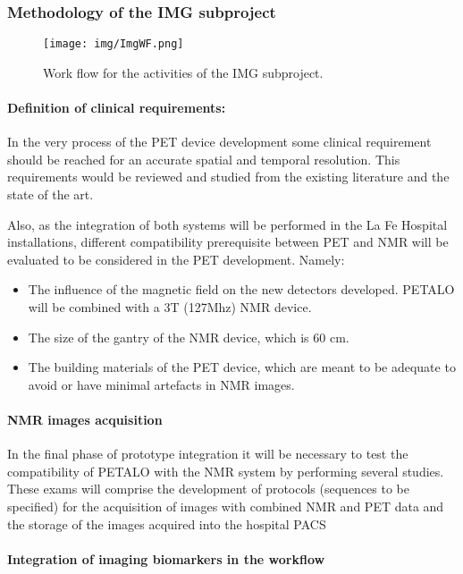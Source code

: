 \subsubsection*{Methodology of the IMG subproject}


\begin{figure}[!htb]
	\centering
	\texttt{[image: img/ImgWF.png]}
	\caption{\label{fig.ImgWF} Work flow for the activities of the IMG subproject.  }
\end{figure}

\paragraph{Definition of clinical requirements:}

In the very process of the PET device development some clinical requirement should be reached for an accurate spatial and temporal resolution. This requirements would be reviewed and studied from the existing literature and the state of the art.

Also, as the integration of both systems will be performed in the La Fe Hospital installations, different compatibility prerequisite between PET and NMR will be evaluated to be considered in the PET development. Namely:
\begin{itemize}
\item The influence of the magnetic field on the new detectors developed. PETALO will be combined with a 3T (127Mhz) NMR device.
\item The size of the gantry of the NMR device, which is 60 cm.
\item The building materials of the PET device, which are meant to be adequate to avoid or have minimal artefacts in NMR images. 
\end{itemize}

\paragraph{NMR images acquisition}

In the final phase of prototype integration it will be necessary to test the compatibility of PETALO with the NMR system by performing several studies. These exams will comprise the development of protocols (sequences to be specified) for the acquisition of images with combined NMR and PET data and the storage of the images acquired into the hospital PACS

\paragraph{Integration of imaging biomarkers in the workflow}

